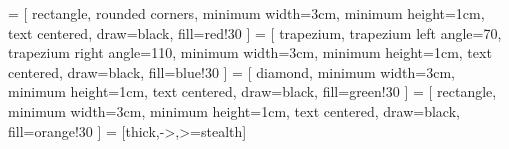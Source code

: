 \usepackage{tikz}
\usetikzlibrary{shapes.geometric, arrows}
 = [
    rectangle,
    rounded corners,
    minimum width=3cm,
    minimum height=1cm,
    text centered,
    draw=black,
    fill=red!30
]
 = [
    trapezium,
    trapezium left angle=70,
    trapezium right angle=110,
    minimum width=3cm,
    minimum height=1cm,
    text centered,
    draw=black,
    fill=blue!30
]
 = [
    diamond,
    minimum width=3cm,
    minimum height=1cm,
    text centered,
    draw=black,
    fill=green!30
]
 = [
    rectangle,
    minimum width=3cm,
    minimum height=1cm,
    text centered,
    draw=black,
    fill=orange!30
]
 = [thick,->,>=stealth]
